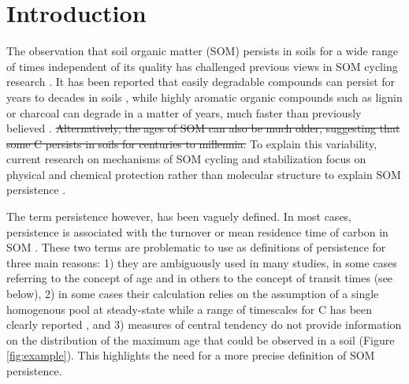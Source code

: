 \documentclass[draft,linenumbers]{agujournal}
\providecommand{\DIFadd}[1]{{\protect\color{blue}\uwave{#1}}} %
\providecommand{\DIFdel}[1]{{\protect\color{red}\sout{#1}}}                      %
\providecommand{\DIFaddbegin}{} %
\providecommand{\DIFaddend}{} %
\providecommand{\DIFdelbegin}{} %
\providecommand{\DIFdelend}{} %
\begin{document}
\section{Introduction}
The observation that soil organic matter (SOM) persists in soils for a wide range of times independent of its quality has challenged previous views in SOM cycling research \citep{Kleber2010, Schmidt2011, Dungait2012, Gleixner2013, Paul2016}. It has been reported that easily degradable compounds can persist for years to decades in soils \citep{Kiem2003, Kleber2010}, while highly aromatic organic compounds such as lignin or charcoal can degrade in a matter of years, much faster than previously believed \citep{Gleixner1999, Kleber2010, Heim2007, Lehmann2015}. \DIFdelbegin \DIFdel{Alternatively, the ages of SOM can also be much older, suggesting that some C persists in soils for centuries to millennia. }\DIFdelend %
To explain this variability, current research on mechanisms of SOM cycling and stabilization focus on physical and chemical protection rather than molecular structure to explain SOM persistence \citep{Schmidt2011, LehmannKleber}. 

The term persistence however, has been vaguely defined. In most cases, persistence is associated with the turnover or mean residence time of carbon in SOM \citep{Schmidt2011, Derrien2011, Lehmann2015}. These two terms are problematic to use as definitions of persistence for three main reasons: 1) they are ambiguously used in many studies, in some cases referring to the concept of age and in others to the concept of transit times (see below), 2) in some cases their calculation relies on the assumption of a single homogenous pool at steady-state while a range of timescales for C has been clearly reported \DIFaddbegin \DIFadd{\mbox{%
\citep{Trumbore2000, Trumbore2009}}%
}\DIFaddend , and 3) measures of central tendency do not provide information on the distribution of the maximum age that could be observed in a soil (Figure \ref{fig:example}). This highlights the need for a more precise definition of SOM persistence. %
\end{document}

